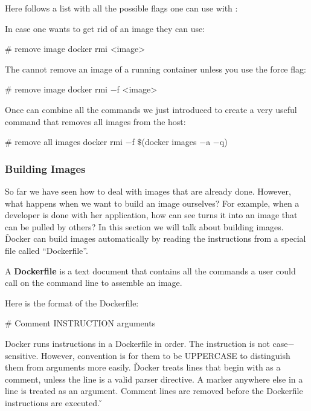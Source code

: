 Here follows a list with all the possible flags one can use with :


In case one wants to get rid of an image they can use:

\begin{bash}
# remove image
docker rmi <image>
\end{bash}

The  cannot remove an image of a running container unless you use the force  flag:

\begin{bash}
# remove image
docker rmi $-$f <image>
\end{bash}

Once can combine all the commands we just introduced to create a very useful command that removes all images from the
host:

\begin{bash}
# remove all images
docker rmi $-$f $\$$(docker images $-$a $-$q)
\end{bash}

\subsubsection{Building Images}

So far we have seen how to deal with images that are already done. However, what happens when we want to build an
image ourselves? For example, when a developer is done with her application, how can see turns it into an image that
can be pulled by others? In this section we will talk about building images. \v

Docker can build images automatically by reading the instructions from a special file called ``Dockerfile''.

\bd[Dockerfile]
A \textbf{Dockerfile} is a text document that contains all the commands a user could call on the command line to
assemble an image.
\ed

Here is the format of the Dockerfile:

\begin{block}
# Comment
INSTRUCTION arguments
\end{block}

Docker runs instructions in a Dockerfile in order. The instruction is not case$-$sensitive. However, convention is
for them to be UPPERCASE to distinguish them from arguments more easily. \v

Docker treats lines that begin with \code{$\#$} as a comment, unless the line is a valid parser directive. A
\code{$\#$} marker anywhere else in a line is treated as an argument. Comment lines are removed before the Dockerfile
instructions are executed. \v

